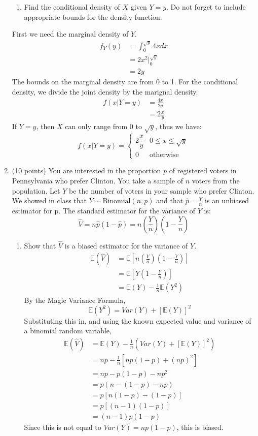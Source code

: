 \documentclass[12pt]{article}
\def\E{{\mathbb E}}
\begin{document}
\begin{enumerate}
\begin{enumerate}
\item Find the conditional density of $X$ given $Y = y$. Do not forget to include appropriate bounds for the density function.
\end{enumerate}
First we need the marginal density of $Y$.
\begin{align*}
f_Y(y) &= \int_0^{\sqrt{y}} 4x dx\\
&= 2x^2 \Bigr|_0^{\sqrt{y}} \\
&= 2y
\end{align*}
The bounds on the marginal density are from 0 to 1. For the conditional density, we divide the joint density by the marignal density.
\begin{align*}
f(x|Y = y) &= \frac{4x}{2y}\\
&= 2 \frac{x}{y}
\end{align*}
If $Y = y$, then $X$ can only range from 0 to $\sqrt{y}$, thus we have:
\[
f(x|Y = y) = \begin{cases}
2 \dfrac{x}{y} & 0 \leq x \leq \sqrt{y}\\
0 & \text{otherwise}
\end{cases}
\]

\pagebreak

\item (10 points) You are interested in the proportion $p$ of registered voters in Pennsylvania who prefer Clinton. You take a sample of $n$ voters from the population. Let $Y$ be the number of voters in your sample who prefer Clinton. We showed in class that $Y \sim \text{Binomial}(n, p)$ and that $\hat{p} = \frac{Y}{n}$ is an unbiased estimator for p. The standard estimator for the variance of $Y$ is:
\[
\hat{V} = n \hat{p}(1 - \hat{p}) = n \left( \frac{Y}{n}\right)\left(1 - \frac{Y}{n} \right)
\]
\begin{enumerate}
\item Show that $\hat{V}$ is a biased estimator for the variance of $Y$.\\

\begin{align*}
\E(\hat{V}) &= \E\left[ n \left( \frac{Y}{n}\right)\left(1 - \frac{Y}{n} \right) \right] \\
&= \E\left[Y \left( 1 - \frac{Y}{n} \right) \right] \\
&= \E(Y) - \frac{1}{n} \E(Y^2) 
\end{align*}
By the Magic Variance Formula,
\[
\E(Y^2) = Var(Y) + [\E(Y)]^2
\]
Substituting this in, and using the known expected value and variance of a binomial random variable,
\begin{align*}
\E(\hat{V}) &= \E(Y) - \frac{1}{n} ( Var(Y) + [\E(Y)]^2 )\\
&= np - \frac{1}{n}[np(1-p) + (np)^2]\\
&= np - p(1-p) - np^2 \\
&= p( n - (1 - p) - np) \\
&= p[ n(1 - p) - (1 - p)]\\
&= p[ (n - 1)(1-p) ]\\
&= (n-1)p(1-p)
\end{align*}
Since this is not equal to $Var(Y) = np(1-p)$, this is biased.


\end{enumerate}
\end{enumerate}
\end{document}
